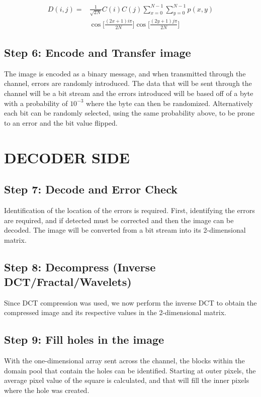 \documentclass[10pt,twocolumn, a4paper]{witseiepaper}
\begin{document}
\begin{equation}
\label{eqn: DCT}
\begin{split}
D(i,j) =& \frac{1}{\sqrt{2N}}C(i)C(j)\sum_{x=0}^{N-1}\sum_{y=0}^{N-1}p(x,y)\\
& \cos \bigg[ {\frac{(2x+1)i\pi}{2N}}\bigg]\cos \bigg[{\frac{(2y+1)j\pi}{2N}}\bigg]
\end{split}
\end{equation}

\subsection{Step 6: Encode and Transfer image}
\label{sec: Step 6}
The image is encoded as a binary message, and when transmitted through the channel, errors are randomly introduced. The data that will be sent through the channel will be a bit stream and the errors introduced will be based off of a byte with a probability of $10^{-3}$ where the byte can then be randomized. Alternatively each bit can be randomly selected, using the same probability above, to be prone to an error and the bit value flipped.


\section{DECODER SIDE}
\label{sec: Decoder Side}
\subsection{Step 7: Decode and Error Check}
\label{sec: Step 7}
Identification of the location of the errors is required. First, identifying the errors are required, and if detected must be corrected and then the image can be decoded. The image will be converted from a bit stream into its 2-dimensional matrix.

\subsection{Step 8: Decompress (Inverse DCT/Fractal/Wavelets)}
\label{sec: Step 8}
Since DCT compression was used, we now perform the inverse DCT to obtain the compressed image and its respective values in the 2-dimensional matrix.

\subsection{Step 9: Fill holes in the image}
\label{sec: Step 9}
With the one-dimensional array sent across the channel, the blocks within the domain pool that contain the holes can be identified. Starting at outer pixels, the average pixel value of the square is calculated, and that will fill the inner pixels where the hole was created.
\end{document}

